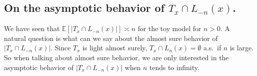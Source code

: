 \documentclass[12pt]{article}
\numberwithin{equation}{section}
\newcommand{\1}{\mathbf{1}}
\begin{document}
 
 
 
 
 
 
 
 
 
 
 
 
 
 
 

 
 
 
 
 
 
 
 
 
 
 \subsection[\texorpdfstring{On the asymptotic behavior of $T_x\cap L_{-n}(x)$.}{On the asymptotic behavior of a tree with low slabs.}]{On the asymptotic behavior of $T_x\cap L_{-n}(x)$.}\label{sec: subsection 3.2}
 
 
 We have seen that $\mathbb{E}[|T_x\cap L_{-n}(x)|]\asymp n$ for the toy model for $n>0$. A natural question is what can we say about the almost sure behavior of $|T_x\cap L_{-n}(x)|$. Since $T_x$ is light almost surely, $T_x\cap L_n(x)=\emptyset$ a.s.\ if $n$ is large. So when talking about almost sure behavior, we are only interested in the  asymptotic behavior of  $|T_x\cap L_{-n}(x)|$ when $n$ tends to infinity.
 
 
\end{document}

